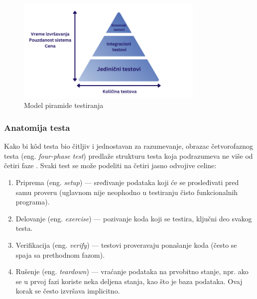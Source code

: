\documentclass[12pt,oneside]{memoir}
\begin{document}
\begin{figure}[!ht]
  \centering
  \includegraphics[width=0.8\textwidth]{piramidanova.png}
  \caption{Model piramide testiranja}
  \label{fig:piramida}
\end{figure}

\subsubsection{Anatomija testa}
\par Kako bi k\^{o}d testa bio čitljiv i jednostavan za razumevanje, obrazac četvorofaznog testa (eng. \emph{four-phase test}) predlaže strukturu testa koja podrazumeva ne više od četiri faze \cite{4phase}. Svaki test se može podeliti na četiri jasno odvojive celine:  
\begin{enumerate}
\item Priprema (eng. \emph{setup}) --- sređivanje podataka koji će se prosleđivati pred samu proveru (uglavnom nije neophodno u testiranju čisto funkcionalnih programa).
\item Delovanje (eng. \emph{exercise}) --- pozivanje koda koji se testira, ključni deo svakog testa.
\item Verifikacija (eng. \emph{verify}) --- testovi proveravaju ponašanje koda (često se spaja sa prethodnom fazom). 
\item Rušenje (eng. \emph{teardown}) --- vraćanje podataka na prvobitno stanje, npr. ako se u prvoj fazi koriste neka deljena stanja, kao što je baza podataka. Ovaj korak se često izvršava implicitno. 
\end{enumerate}
\end{document}
